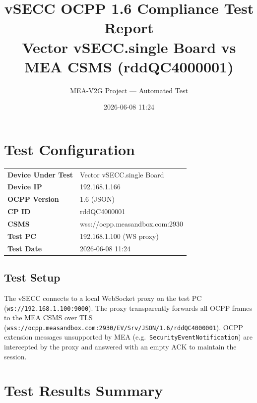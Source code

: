 \documentclass[10pt, a4paper]{article}
\title{\textbf{vSECC OCPP 1.6 Compliance Test Report}\\[0.5em]
\large Vector vSECC.single Board vs MEA CSMS (rddQC4000001)}
\author{MEA-V2G Project --- Automated Test}
\date{2026-06-08 11:24}
\begin{document}
\maketitle
\tableofcontents
\newpage

\section{Test Configuration}
\begin{tabular}{ll}
\textbf{Device Under Test} & Vector vSECC.single Board \\
\textbf{Device IP} & 192.168.1.166 \\
\textbf{OCPP Version} & 1.6 (JSON) \\
\textbf{CP ID} & rddQC4000001 \\
\textbf{CSMS} & wss://ocpp.measandbox.com:2930 \\
\textbf{Test PC} & 192.168.1.100 (WS proxy) \\
\textbf{Test Date} & 2026-06-08 11:24 \\
\end{tabular}

\subsection*{Test Setup}
The vSECC connects to a local WebSocket proxy on the test PC (\texttt{ws://192.168.1.100:9000}).
The proxy transparently forwards all OCPP frames to the MEA CSMS over TLS
(\texttt{wss://ocpp.measandbox.com:2930/EV/Srv/JSON/1.6/rddQC4000001}).
OCPP extension messages unsupported by MEA (e.g.\ \texttt{SecurityEventNotification})
are intercepted by the proxy and answered with an empty ACK to maintain the session.

\section{Test Results Summary}
\end{document}
